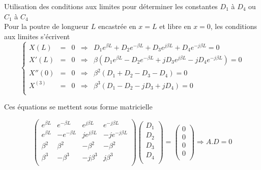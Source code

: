 \documentclass[a4paper,10pt]{article}
\begin{document}
Utilisation des conditions aux limites pour déterminer les constantes \begin{math} D_1 \end{math} à \begin{math} D_4 \end{math} ou  \begin{math} C_1 \end{math} à \begin{math} C_4 \end{math}
\\
Pour la poutre de longueur \begin{math} L \end{math} encastrée en \begin{math} x=L \end{math} et libre en \begin{math} x=0 \end{math}, les conditions aux limites s'écrivent
\begin{equation} 
	\left\{
		\begin{aligned}
			X(L) 	&=& 	0  &\Rightarrow&  D_1 e^{\beta L} +  D_2 e^{-\beta L} +  D_3 e^{j\beta L} +  D_4 e^{-j\beta L} =  0 \\
			X'(L) 	&=&	0  &\Rightarrow&  \beta ( D_1 e^{\beta L} -  D_2 e^{-\beta L} + j D_3 e^{j\beta L} - j D_4 e^{-j\beta L} ) =  0\\
			X''(0)	&=&	0  &\Rightarrow&  \beta^2 ( D_1  +  D_2 -   D_3  -  D_4 ) =  0  \\
			X^{(3)} &=& 0  &\Rightarrow&  \beta^3 ( D_1  -  D_2 -  j D_3  + j D_4 ) =  0  \\
		\end{aligned}	
	\right.
 \end{equation}

Ces équations se mettent sous forme matricielle

\begin{equation} 
	\begin{pmatrix}
   	e^{\beta L} 	& e^{-\beta L} 	& e^{j\beta L} 	& e^{-j\beta L}	\\
   	 e^{\beta L} & -e^{-\beta L}	&j e^{j\beta L}	& -je^{-j\beta L}	\\
  	 \beta^2	&\beta^2		&-\beta^2		&-\beta^2		\\
	\beta^3	&-\beta^3		&-j\beta^3		&j\beta^3		\\
	\end{pmatrix} 
	\begin{pmatrix}
   	D_1 	\\
   	D_2	\\
  	D_3	\\
	D_4	\\
	\end{pmatrix} 
= 
	\begin{pmatrix}
   	0 	\\
   	0	\\
  	0	\\
	0	\\
	\end{pmatrix} 
	\Rightarrow
	A.D=0
\end{equation}
\end{document}
